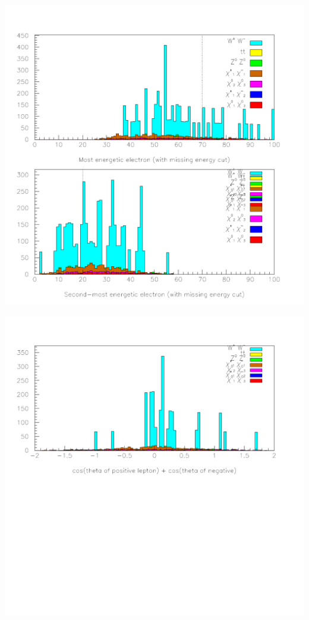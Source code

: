 \documentclass[landscape]{article}
\begin{document}
\begin{center} \includegraphics[height=0.8\textheight]{two_hours_3.pdf} \end{center}
\pagebreak

\begin{center} \includegraphics[height=0.8\textheight]{two_hours_4.pdf} \end{center}
\pagebreak
\end{document}
